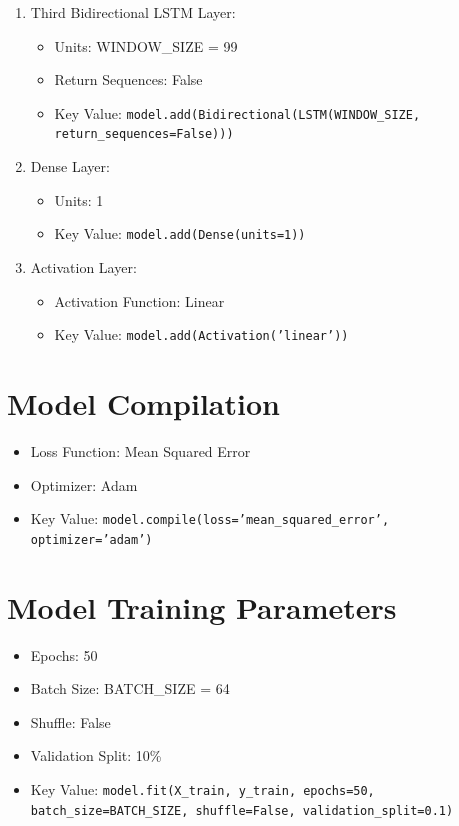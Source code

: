 \begin{enumerate}
    \item {Third Bidirectional LSTM Layer}:
    \begin{itemize}
        \item Units: WINDOW\_SIZE = 99
        \item Return Sequences: False
        \item Key Value: \texttt{model.add(Bidirectional(LSTM(WINDOW\_SIZE, return\_sequences=False)))}
    \end{itemize}

    \item {Dense Layer}:
    \begin{itemize}
        \item Units: 1
        \item Key Value: \texttt{model.add(Dense(units=1))}
    \end{itemize}

    \item {Activation Layer}:
    \begin{itemize}
        \item Activation Function: Linear
        \item Key Value: \texttt{model.add(Activation('linear'))}
    \end{itemize}
\end{enumerate}

\section*{Model Compilation}

\begin{itemize}
    \item Loss Function: Mean Squared Error
    \item Optimizer: Adam
    \item Key Value: \texttt{model.compile(loss='mean\_squared\_error', optimizer='adam')}
\end{itemize}

\section*{Model Training Parameters}

\begin{itemize}
    \item Epochs: 50
    \item Batch Size: BATCH\_SIZE = 64
    \item Shuffle: False
    \item Validation Split: 10\%
    \item Key Value: \texttt{model.fit(X\_train, y\_train, epochs=50, batch\_size=BATCH\_SIZE, shuffle=False, validation\_split=0.1)}
\end{itemize}

